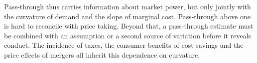Pass-through thus carries information about market power, but only jointly with the curvature of demand and the
slope of marginal cost. Pass-through above one is hard to reconcile with price taking. Beyond that, a pass-through
estimate must be combined with an assumption or a second source of variation before it reveals conduct. The
incidence of taxes, the consumer benefits of cost savings and the price effects of mergers all inherit this
dependence on curvature.

